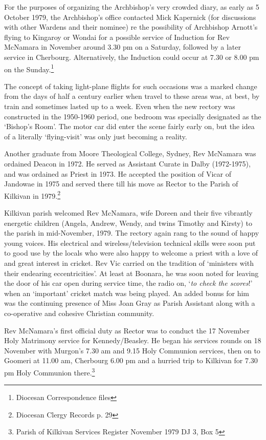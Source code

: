 For the purposes of organizing the Archbishop's very crowded diary, as early as 5 October 1979, the Archbishop's office contacted Mick Kapernick (for discussions with other Wardens and their nominee) re the possibility of Archbishop Arnott's flying to Kingaroy or Wondai for a possible service of Induction for Rev McNamara in November around 3.30 pm on a Saturday, followed by a later service in Cherbourg. Alternatively, the Induction could occur at 7.30 or 8.00 pm on the Sunday.\footnote{Diocesan Correspondence files}


The concept of taking light-plane flights for such occasions was a marked change from the days of half a century earlier when travel to these areas was, at best, by train and sometimes lasted up to a week. Even when the new rectory was constructed in the 1950-1960 period, one bedroom was specially designated as the `Bishop's Room'. The motor car did enter the scene fairly early on, but the idea of a literally `flying-visit' was only just becoming a reality.



Another graduate from Moore Theological College, Sydney, Rev McNamara was ordained Deacon in 1972. He served as Assistant Curate in Dalby (1972-1975), and was ordained as Priest in 1973. He accepted the position of Vicar of Jandowae in 1975 and served there till his move as Rector to the Parish of Kilkivan in 1979.\footnote{Diocesan Clergy Records p. 29}


Kilkivan parish welcomed Rev McNamara, wife Doreen and their five vibrantly energetic children (Angela, Andrew, Wendy, and twins Timothy and Kirsty) to the parish in mid-November, 1979. The rectory again rang to the sound of happy young voices. His electrical and wireless/television technical skills were soon put to good use by the locals who were also happy to welcome a priest with a love of and great interest in cricket. Rev Vic carried on the tradition of `ministers with their endearing eccentricities'. At least at Boonara, he was soon noted for leaving the door of his car open during service time, the radio on, `\emph{to check the scores}!' when an `important' cricket match was being played. An added bonus for him was the continuing presence of Miss Joan Gray as Parish Assistant along with a co-operative and cohesive Christian community.



Rev McNamara's first official duty as Rector was to conduct the 17 November Holy Matrimony service for Kennedy/Beasley. He began his services rounds on 18 November with Murgon's 7.30 am and 9.15 Holy Communion services, then on to Goomeri at 11.00 am, Cherbourg 6.00 pm and a hurried trip to Kilkivan for 7.30 pm Holy Communion there.\footnote{Parish of Kilkivan Services Register November 1979 DJ 3, Box 5}


